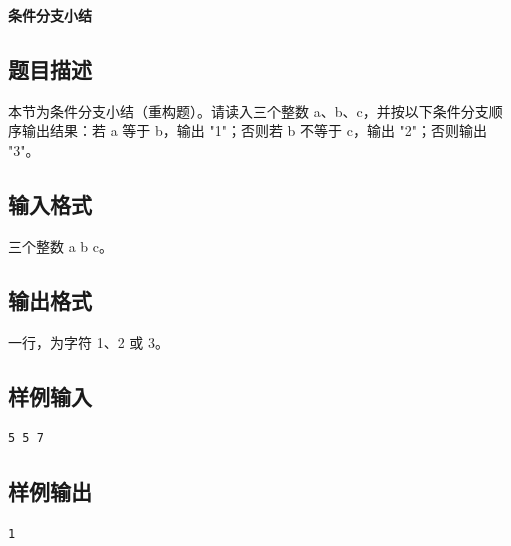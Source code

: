 \documentclass{article}
\newcommand{\problemname}[1]{\begin{center}\Large\bfseries #1\end{center}}
\begin{document}
\problemname{条件分支小结}

\subsection*{题目描述}
本节为条件分支小结（重构题）。请读入三个整数 a、b、c，并按以下条件分支顺序输出结果：若 a 等于 b，输出 "1"；否则若 b 不等于 c，输出 "2"；否则输出 "3"。

\subsection*{输入格式}
三个整数 a b c。

\subsection*{输出格式}
一行，为字符 1、2 或 3。

\subsection*{样例输入}
\begin{verbatim}
5 5 7
\end{verbatim}

\subsection*{样例输出}
\begin{verbatim}
1
\end{verbatim}
\end{document}
